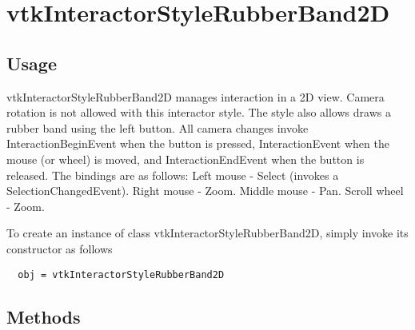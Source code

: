 \section{vtkInteractorStyleRubberBand2D}

\subsection{Usage}

 vtkInteractorStyleRubberBand2D manages interaction in a 2D view.
 Camera rotation is not allowed with this interactor style.
 The style also allows draws a rubber band using the left button.
 All camera changes invoke InteractionBeginEvent when the button
 is pressed, InteractionEvent when the mouse (or wheel) is moved,
 and InteractionEndEvent when the button is released.  The bindings
 are as follows:
 Left mouse - Select (invokes a SelectionChangedEvent).
 Right mouse - Zoom.
 Middle mouse - Pan.
 Scroll wheel - Zoom.

To create an instance of class vtkInteractorStyleRubberBand2D, simply
invoke its constructor as follows
\begin{verbatim}
  obj = vtkInteractorStyleRubberBand2D
\end{verbatim}
\subsection{Methods}

